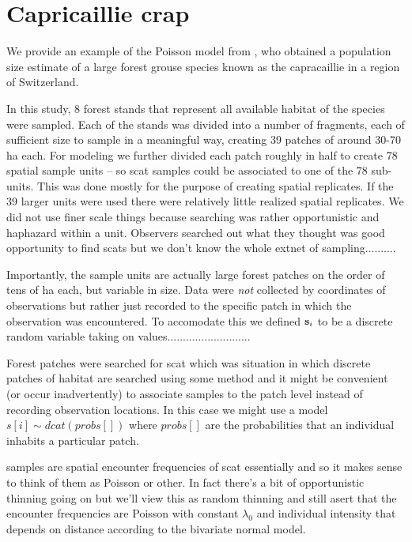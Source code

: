 \section{Capricaillie crap}

We provide an example of the Poisson model from 
 \citet{mollet_etal:2012}, who obtained a population
size estimate  of a large forest grouse species known as the
capracaillie in a region of Switzerland. 

In this study, 
8 forest stands  that represent all available habitat of the
species were sampled. Each of the stands was divided into a number of
fragments, each of 
sufficient size to sample in a meaningful way, creating 39 patches of around
30-70 ha each. For modeling we further divided each patch roughly in half to
create 78 spatial sample units -- so scat samples could be associated to one of
the 78 sub-units. This was done mostly for the purpose of creating spatial
replicates. If the 39 larger units were used there were relatively little
realized spatial replicates. 
We did not use finer scale things because searching was rather opportunistic
and haphazard within a unit. Observers searched out what they thought was
good opportunity to find scats but we don't know the whole extnet of
sampling..........

Importantly, the sample units are actually large forest
patches on the order of tens of ha each, but variable in size. Data
were {\it not} collected by coordinates of observations but rather
just recorded to the specific patch in which the observation was
encountered. To accomodate this we defined ${\bf s}_{i}$ to be a
discrete
random variable taking on values...........................

Forest patches were searched for scat which was
situation in which discrete patches of habitat are searched using some
method and it might be convenient (or occur inadvertently) to
associate samples to the patch level instead of recording observation
locations. In this case we might use a model $s[i] \sim dcat(probs[])$
where $probs[]$ are the probabilities that an individual inhabits a
particular patch.

samples are spatial encounter frequencies of scat essentially and so
it makes sense to think of them as Poisson or other.
In fact there's a bit of opportunistic thinning going on but we'll view
this as random thinning and still asert that the encounter frequencies
are Poisson with constant $\lambda_{0}$ and individual intensity that
depends on distance according to the bivariate normal model. 



